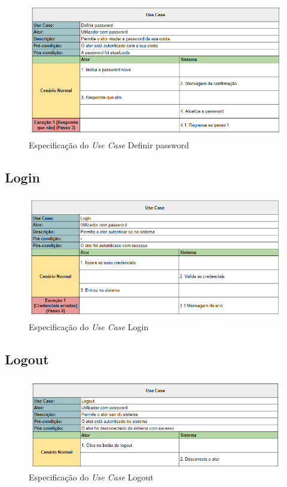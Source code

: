 \documentclass[a4paper]{report}
\begin{document}
\begin{figure}[H]
	\centering 
    \includegraphics[width=\textwidth]{images/Definir_Password.png}  
    \caption{Especificação do \emph{Use Case} Definir password}
\end{figure}

\subsection{Login}

\begin{figure}[H]
	\centering 
    \includegraphics[width=\textwidth]{images/Login.png}  
	\caption{Especificação do \emph{Use Case} Login}
\end{figure}

\subsection{Logout}

\begin{figure}[H]
	\centering 
    \includegraphics[width=\textwidth]{images/Logout.png}  
    \caption{Especificação do \emph{Use Case} Logout}
\end{figure}
\end{document}
